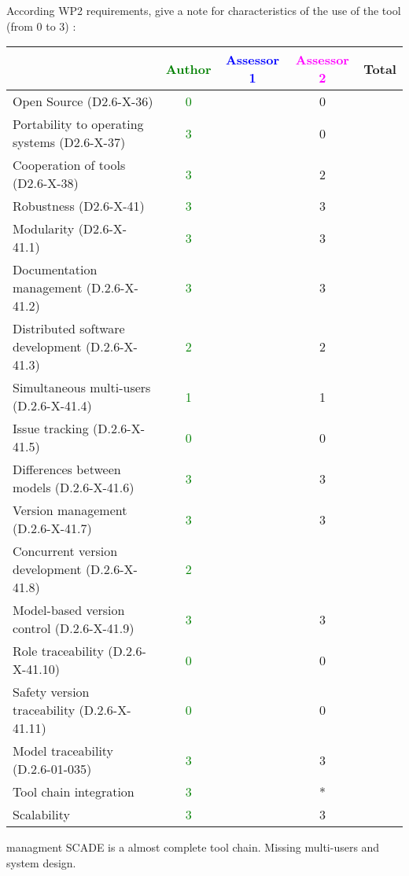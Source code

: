 According WP2 requirements, give a note for characteristics of the use of the tool (from 0 to 3) :

\begin{tabular}{|l | c | c | c | c|}
\hline
& \textcolor{green}{Author} & \textcolor{blue}{Assessor 1} & \textcolor{magenta}{Assessor 2} & Total \\
\hline 
Open Source (D2.6-X-36) &  \textcolor{green}{0}& &0 &  \\
\hline 
Portability to operating systems (D2.6-X-37) &  \textcolor{green}{3}& &0 &  \\
\hline
Cooperation of tools (D2.6-X-38) &  \textcolor{green}{3}& &2 &  \\
\hline
Robustness (D2.6-X-41) &  \textcolor{green}{3}& &3 & \\
\hline
Modularity (D2.6-X-41.1) &  \textcolor{green}{3}& &3 & \\
\hline
Documentation management (D.2.6-X-41.2) &  \textcolor{green}{3}& &3 & \\
\hline
Distributed software development (D.2.6-X-41.3)  &  \textcolor{green}{2}& &2 & \\
\hline
Simultaneous multi-users (D.2.6-X-41.4)   &  \textcolor{green}{1}& &1 & \\
\hline
Issue tracking (D.2.6-X-41.5) &  \textcolor{green}{0}& &0 & \\
\hline
Differences between models (D.2.6-X-41.6) &  \textcolor{green}{3}& &3 & \\
\hline
Version management (D.2.6-X-41.7) &  \textcolor{green}{3}& &3 & \\
\hline
Concurrent version development (D.2.6-X-41.8) &  \textcolor{green}{2}& & & \\
\hline
Model-based version control (D.2.6-X-41.9) &  \textcolor{green}{3}& &3 & \\
\hline
Role traceability (D.2.6-X-41.10) &  \textcolor{green}{0}& &0 & \\
\hline
Safety version traceability (D.2.6-X-41.11) &  \textcolor{green}{0}& &0 & \\
\hline
Model traceability (D.2.6-01-035) & \textcolor{green}{3} & &3 & \\
\hline
Tool chain integration & \textcolor{green}{3} & &* & \\
\hline
Scalability & \textcolor{green}{3} & &3 & \\
\hline
\end{tabular}

\begin{assessor2}managment
SCADE is a almost complete tool chain. Missing multi-users and system design.
\end{assessor2}
